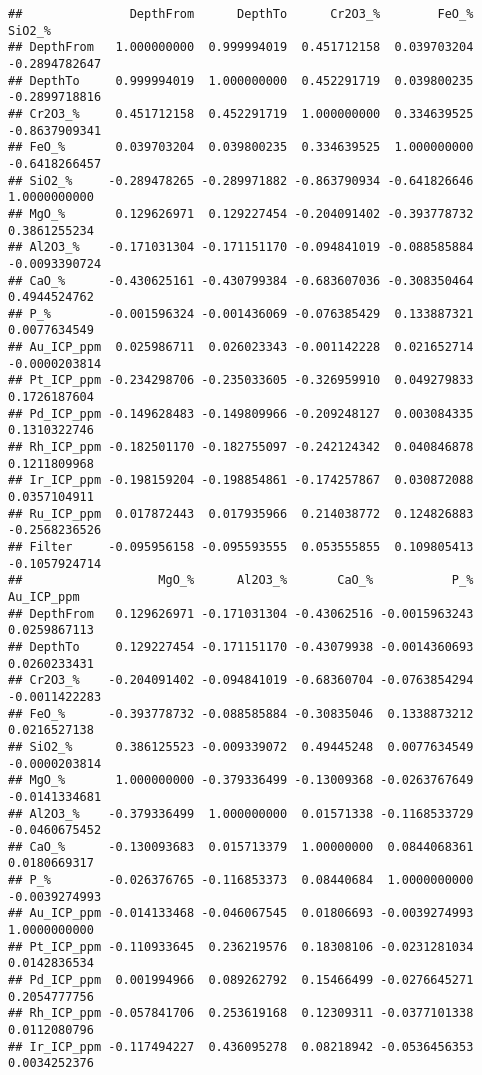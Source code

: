 \documentclass[
]{article}
\begin{document}
\begin{verbatim}
##               DepthFrom      DepthTo      Cr2O3_%        FeO_%        SiO2_%
## DepthFrom   1.000000000  0.999994019  0.451712158  0.039703204 -0.2894782647
## DepthTo     0.999994019  1.000000000  0.452291719  0.039800235 -0.2899718816
## Cr2O3_%     0.451712158  0.452291719  1.000000000  0.334639525 -0.8637909341
## FeO_%       0.039703204  0.039800235  0.334639525  1.000000000 -0.6418266457
## SiO2_%     -0.289478265 -0.289971882 -0.863790934 -0.641826646  1.0000000000
## MgO_%       0.129626971  0.129227454 -0.204091402 -0.393778732  0.3861255234
## Al2O3_%    -0.171031304 -0.171151170 -0.094841019 -0.088585884 -0.0093390724
## CaO_%      -0.430625161 -0.430799384 -0.683607036 -0.308350464  0.4944524762
## P_%        -0.001596324 -0.001436069 -0.076385429  0.133887321  0.0077634549
## Au_ICP_ppm  0.025986711  0.026023343 -0.001142228  0.021652714 -0.0000203814
## Pt_ICP_ppm -0.234298706 -0.235033605 -0.326959910  0.049279833  0.1726187604
## Pd_ICP_ppm -0.149628483 -0.149809966 -0.209248127  0.003084335  0.1310322746
## Rh_ICP_ppm -0.182501170 -0.182755097 -0.242124342  0.040846878  0.1211809968
## Ir_ICP_ppm -0.198159204 -0.198854861 -0.174257867  0.030872088  0.0357104911
## Ru_ICP_ppm  0.017872443  0.017935966  0.214038772  0.124826883 -0.2568236526
## Filter     -0.095956158 -0.095593555  0.053555855  0.109805413 -0.1057924714
##                   MgO_%      Al2O3_%       CaO_%           P_%    Au_ICP_ppm
## DepthFrom   0.129626971 -0.171031304 -0.43062516 -0.0015963243  0.0259867113
## DepthTo     0.129227454 -0.171151170 -0.43079938 -0.0014360693  0.0260233431
## Cr2O3_%    -0.204091402 -0.094841019 -0.68360704 -0.0763854294 -0.0011422283
## FeO_%      -0.393778732 -0.088585884 -0.30835046  0.1338873212  0.0216527138
## SiO2_%      0.386125523 -0.009339072  0.49445248  0.0077634549 -0.0000203814
## MgO_%       1.000000000 -0.379336499 -0.13009368 -0.0263767649 -0.0141334681
## Al2O3_%    -0.379336499  1.000000000  0.01571338 -0.1168533729 -0.0460675452
## CaO_%      -0.130093683  0.015713379  1.00000000  0.0844068361  0.0180669317
## P_%        -0.026376765 -0.116853373  0.08440684  1.0000000000 -0.0039274993
## Au_ICP_ppm -0.014133468 -0.046067545  0.01806693 -0.0039274993  1.0000000000
## Pt_ICP_ppm -0.110933645  0.236219576  0.18308106 -0.0231281034  0.0142836534
## Pd_ICP_ppm  0.001994966  0.089262792  0.15466499 -0.0276645271  0.2054777756
## Rh_ICP_ppm -0.057841706  0.253619168  0.12309311 -0.0377101338  0.0112080796
## Ir_ICP_ppm -0.117494227  0.436095278  0.08218942 -0.0536456353  0.0034252376

\end{verbatim}
\end{document}
